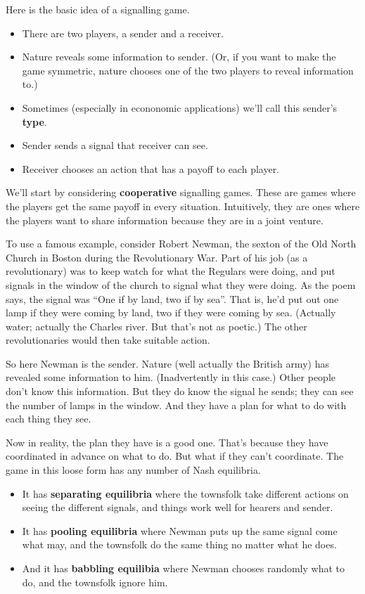 \documentclass[11pt,]{article}
\providecommand{\tightlist}{%
  \setlength{\itemsep}{0pt}\setlength{\parskip}{0pt}}
\begin{document}
Here is the basic idea of a signalling game.

\begin{itemize}
\tightlist
\item
  There are two players, a sender and a receiver.
\item
  Nature reveals some information to sender. (Or, if you want to make
  the game symmetric, nature chooses one of the two players to reveal
  information to.)
\item
  Sometimes (especially in econonomic applications) we'll call this
  sender's \textbf{type}.
\item
  Sender sends a signal that receiver can see.
\item
  Receiver chooses an action that has a payoff to each player.
\end{itemize}

We'll start by considering \textbf{cooperative} signalling games. These
are games where the players get the same payoff in every situation.
Intuitively, they are ones where the players want to share information
because they are in a joint venture.

To use a famous example, consider Robert Newman, the sexton of the Old
North Church in Boston during the Revolutionary War. Part of his job (as
a revolutionary) was to keep watch for what the Regulars were doing, and
put signals in the window of the church to signal what they were doing.
As the poem says, the signal was ``One if by land, two if by sea''. That
is, he'd put out one lamp if they were coming by land, two if they were
coming by sea. (Actually water; actually the Charles river. But that's
not as poetic.) The other revolutionaries would then take suitable
action.

So here Newman is the sender. Nature (well actually the British army)
has revealed some information to him. (Inadvertently in this case.)
Other people don't know this information. But they do know the signal he
sends; they can see the number of lamps in the window. And they have a
plan for what to do with each thing they see.

Now in reality, the plan they have is a good one. That's because they
have coordinated in advance on what to do. But what if they can't
coordinate. The game in this loose form has any number of Nash
equilibria.

\begin{itemize}
\tightlist
\item
  It has \textbf{separating equilibria} where the townsfolk take
  different actions on seeing the different signals, and things work
  well for hearers and sender.
\item
  It has \textbf{pooling equilibria} where Newman puts up the same
  signal come what may, and the townsfolk do the same thing no matter
  what he does.
\item
  And it has \textbf{babbling equilibia} where Newman chooses randomly
  what to do, and the townsfolk ignore him.
\end{itemize}
\end{document}
